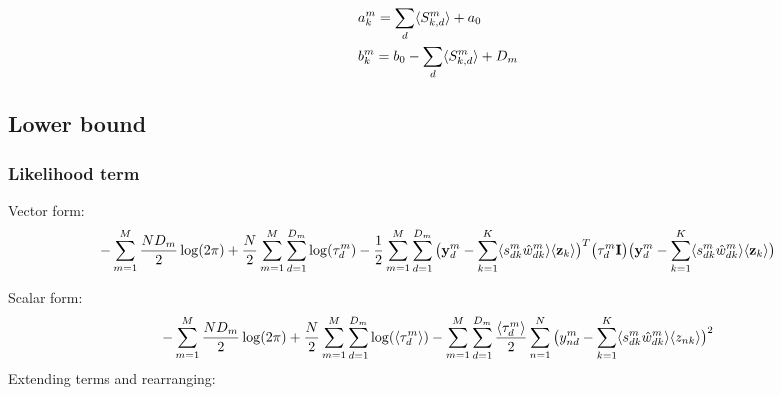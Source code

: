 \documentclass[10pt, a4paper,openany]{report}
\begin{document}
\begin{equation*}
\begin{aligned}
&a_{k}^m = \sum_{d} \langle S^m_{k,d}\rangle + a_0\\
&b_{k}^m = b_0 - \sum_{d} \langle S^m_{k,d}\rangle + D_m
\end{aligned}
\end{equation*}

\subsection*{Lower bound}

\subsubsection{Likelihood term}
Vector form:
\[
-\sum_{m=1}^M \frac{ND_m}{2} \log(2\pi) + \frac{N}{2}\sum_{m=1}^{M}\sum_{d=1}^{D_m}\log(\tau_d^m) - \frac{1}{2} \sum_{m=1}^{M}\sum_{d=1}^{D_m} \big( {\bf y}_d^m - \sum_{k=1}^{K}\langle s_{dk}^m \hat{w}_{dk}^m \rangle \langle {\bf z}_k \rangle \big)^T \big( \tau_d^m {\bf I} \big) \big( {\bf y}_d^m - \sum_{k=1}^{K}\langle s_{dk}^m \hat{w}_{dk}^m \rangle \langle {\bf z}_k \rangle \big)
\]

Scalar form:
\[
-\sum_{m=1}^M \frac{ND_m}{2} \log(2\pi) + \frac{N}{2} \sum_{m=1}^M \sum_{d=1}^{D_m} \log(\langle \tau_d^m \rangle) -\sum_{m=1}^M \sum_{d=1}^{D_m} \frac{\langle \tau_d^m \rangle}{2} \sum_{n=1}^{N} \big( y_{nd}^m - \sum_{k=1}^{K}\langle s_{dk}^m \hat{w}_{dk}^m \rangle \langle z_{nk} \rangle \big)^2
\]
Extending terms and rearranging:
\end{document}
